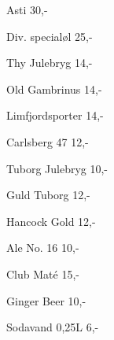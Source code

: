 \documentclass{article}
\begin{document}

\maketitle

\null
\vspace{-0.8cm}


\vspace{0.5cm}

Asti \hfill 30,-

\vspace{0.3cm}

Div. specialøl \hfill 25,-

\vspace{1.3cm}

Thy Julebryg \hfill 14,-

\vspace{0.3cm}

Old Gambrinus \hfill 14,-

\vspace{0.3cm}

Limfjordsporter \hfill 14,-

\vspace{0.3cm}

Carlsberg 47 \hfill 12,-

\vspace{0.3cm}

Tuborg Julebryg \hfill 10,-

\vspace{1.3cm}

Guld Tuborg \hfill 12,-

\vspace{0.3cm}

Hancock Gold \hfill 12,-

\vspace{0.3cm}

Ale No. 16 \hfill 10,-

\vspace{1.3cm}

Club Maté \hfill 15,-

\vspace{0.3cm}

Ginger Beer \hfill 10,-

\vspace{0.3cm}

Sodavand 0,25L \hfill 6,-

\vspace{0.5cm}

\underskriv
\end{document}
